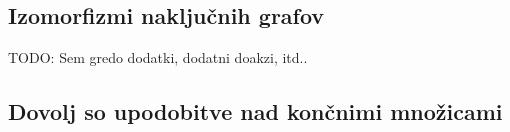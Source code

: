 \documentclass[mat2, tisk]{fmfdelo}
\newcommand{\TODO}[1]{{\color{blue} TODO: #1}}
\begin{document}
            \subsection{Izomorfizmi naključnih grafov}
            \label{dodatek:naključni grafi}
            \TODO{Sem gredo dodatki, dodatni doakzi, itd..}
            \subsection{Dovolj so upodobitve nad končnimi množicami}


\end{document}
